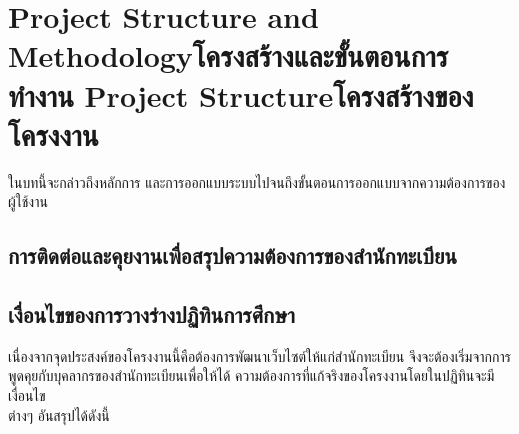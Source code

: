 \chapter{\ifproject%
\ifenglish Project Structure and Methodology\else โครงสร้างและขั้นตอนการทำงาน\fi
\else%
\ifenglish Project Structure\else โครงสร้างของโครงงาน\fi
\fi
}

ในบทนี้จะกล่าวถึงหลักการ และการออกแบบระบบไปจนถึงขั้นตอนการออกแบบจากความต้องการของผู้ใช้งาน

\makeatletter


\makeatother

\section{การติดต่อและคุยงานเพื่อสรุปความต้องการของสำนักทะเบียน}


\section{เงื่อนไขของการวางร่างปฏิทินการศึกษา}
  เนื่องจากจุดประสงค์ของโครงงานนี้คือต้องการพัฒนาเว็บไซต์ให้แก่สำนักทะเบียน
  จึงจะต้องเริ่มจากการพูดคุยกับบุคลากรของสำนักทะเบียนเพื่อให้ได้
  ความต้องการที่แก้จริงของโครงงานโดยในปฏิทินจะมีเงื่อนไข \\ต่างๆ อันสรุปได้ดังนี้

